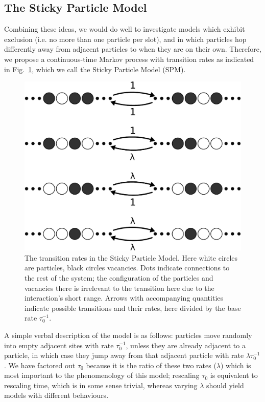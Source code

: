 \subsection{The Sticky Particle Model}
Combining these ideas, we would do well to investigate models which exhibit exclusion (i.e. no more than one 
particle per slot), and in which particles hop differently away from adjacent particles to when they are on their 
own. Therefore, we propose a continuous-time Markov process with transition rates as indicated in
Fig.~\ref{fig:transRates}, which we call the Sticky Particle Model (SPM).
\begin{figure} \caption[The transition rates in the Sticky Particle Model.]{The transition rates in the Sticky Particle Model. Here white circles are particles, black circles vacancies. Dots indicate connections to the rest of 
the system; the configuration of the particles and vacancies there is irrelevant to the transition here due to the
interaction's short range. Arrows with accompanying quantities indicate possible transitions and their rates, here 
divided by the base rate $\tau_0^{-1}$.} 
\label{fig:transRates}
\begin{center}
\includegraphics[width=1.0\textwidth]{intro/images/ratesDB}
\end{center}
\end{figure}
A simple verbal description of the model is as follows: particles move randomly into empty adjacent sites with rate 
$\tau_0^{-1}$, unless they are already adjacent to a particle, in which case they jump away from that adjacent
particle with rate $\lambda \tau_0^{-1}$. We have factored out $\tau_0$ because it is the ratio of these two rates
($\lambda$) which is most important to the phenomenology of this model; rescaling $\tau_0$ is equivalent to 
rescaling time, which is in some sense trivial, whereas varying $\lambda$ should yield models with different behaviours.

